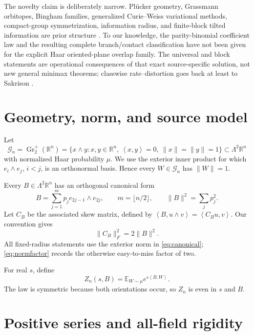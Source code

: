 \documentclass[11pt,a4paper]{article}
\newcommand{\G}{\mathcal G}
\newcommand{\E}{\mathbb E}
\newcommand{\R}{\mathbb R}
\newcommand{\ip}[2]{\left\langle #1,#2\right\rangle}
\DeclareMathOperator{\Gr}{Gr}
\begin{document}
The novelty claim is deliberately narrow.  Pl\"ucker geometry, Grassmann
orbitopes, Bingham families, generalized Curie--Weiss variational methods,
compact-group symmetrization, information radius, and finite-block tilted
information are prior structure
\cite{SanyalSottileSturmfels2011,BarvinokBlekherman2005,Harremoes2009,KostinaVerdu2012}.
To our knowledge, the parity-binomial coefficient law and the resulting
complete branch/contact classification have not been given for the explicit
Haar oriented-plane overlap family.  The universal and block statements are
operational consequences of that exact source-specific solution, not new
general minimax theorems; classwise rate--distortion goes back at least to
Sakrison \cite{Sakrison1969}.

\section{Geometry, norm, and source model}

Let
\[
 \G_n=\Gr_2^+(\R^n)
 =\{x\wedge y:x,y\in\R^n,\ \ip xy=0,\ \|x\|=\|y\|=1\}
 \subset\Lambda^2\R^n
\]
with normalized Haar probability $\mu$.  We use the exterior inner product for which $e_i\wedge e_j$, $i<j$, is an orthonormal basis.  Hence every $W\in\G_n$ has $\|W\|=1$.

Every $B\in\Lambda^2\R^n$ has an orthogonal canonical form
\begin{equation}\label{eq:canonical}
 B=\sum_{j=1}^{m}p_j e_{2j-1}\wedge e_{2j},
 \qquad m=\lfloor n/2\rfloor,
 \qquad \|B\|^2=\sum_jp_j^2.
\end{equation}
Let $C_B$ be the associated skew matrix, defined by
$\ip{B}{u\wedge v}=\ip{C_Bu}{v}$.  Our convention gives
\begin{equation}\label{eq:normfactor}
 \|C_B\|_F^2=2\|B\|^2.
\end{equation}
All fixed-radius statements use the exterior norm in \cref{eq:canonical}; \cref{eq:normfactor} records the otherwise easy-to-miss factor of two.

For real $s$, define
\begin{equation}\label{eq:partition}
 Z_n(s,B)=\E_{W\sim\mu}e^{s\ip BW}.
\end{equation}
The law is symmetric because both orientations occur, so $Z_n$ is even in $s$ and $B$.

\section{Positive series and all-field rigidity}
\end{document}
